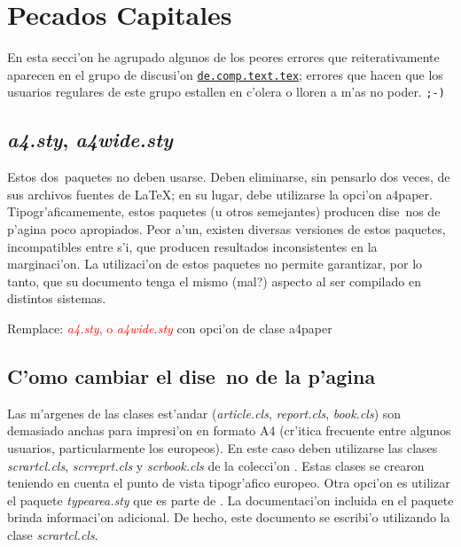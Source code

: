 \documentclass[11pt,a4paper,pagesize,tablecaptionabove,abstracton,pointlessnumbers]{scrartcl}
\newcommand{\News}[1]{\href{news:#1}{\texttt{#1}}}
\newcommand{\News}[1]{\href{news:#1}{\texttt{#1}}}
\newcommand{\gl}{\guillemotleft}
\newcommand{\gr}{\guillemotright}
\newcommand{\qd}{\textquestiondown}
\newcommand{\Paket}[1]{\textsf{\textsl{#1.sty}}\xspace}
\newcommand{\Klasse}[1]{\textsf{\textsl{#1.cls}}\xspace}
\newcommand{\Option}[1]{\textsf{#1}\xspace}
\newcommand{\Ersetze}[2]{\par\noindent Remplace: \textcolor{red}{#1}
  con \textcolor{gruen}{#2}}
\begin{document}
\clearpage
\tableofcontents
\enlargethispage{\baselineskip} 
\clearpage

\section{\gl Pecados Capitales\gr}

\label{sec:todsunden}
En esta secci'on he agrupado algunos de los peores errores que reiterativamente aparecen en el grupo de discusi'on \News{de.comp.text.tex}; errores que hacen que los usuarios regulares de este grupo estallen en c'olera o lloren a m'as no poder. \texttt{;-)}

\subsection{\Paket{a4}, \Paket{a4wide}}
\label{sec:paketa4-paketa4wide}

Estos \gl dos\gr\ paquetes no deben usarse. Deben eliminarse, sin pensarlo dos veces, de sus archivos fuentes de \LaTeX; en su lugar, debe utilizarse la opci'on \Option{a4paper}. Tipogr'aficamemente, estos paquetes (u otros semejantes) producen  dise~nos de p'agina poco apropiados. Peor a'un, existen diversas versiones de estos paquetes, incompatibles entre s'i, que producen resultados inconsistentes en la marginaci'on. La utilizaci'on de estos paquetes no permite garantizar, por lo tanto, que su documento tenga el mismo (\qd mal?) aspecto al ser compilado en distintos sistemas.

\Ersetze{\Paket{a4}, \normalcolor o \color{red} \Paket{a4wide}}{opci'on de clase \Option{a4paper}}

\subsection{C'omo cambiar el dise~no de la p'agina}
\label{sec:layoutanderungen}
Las m'argenes de las clases est'andar (\Klasse{article}, \Klasse{report}, \Klasse{book}) son demasiado anchas para impresi'on en formato A4 (cr'itica frecuente entre algunos usuarios, particularmente los europeos). En este caso deben utilizarse las clases \Klasse{scrartcl}, \Klasse{scrreprt} y \Klasse{scrbook} de la colecci'on \KOMAScript{} . Estas clases se crearon teniendo en cuenta el punto de vista tipogr'afico europeo. Otra opci'on es utilizar el paquete \Paket{typearea} que es parte de \KOMAScript{}. La documentaci'on incluida en el paquete brinda informaci'on adicional. De hecho, este documento se escribi'o utilizando la clase \Klasse{scrartcl}.
\end{document}
